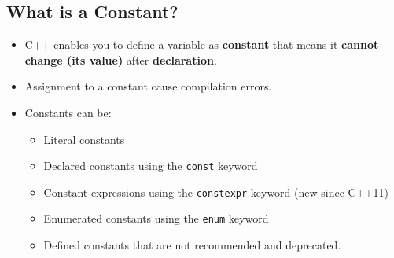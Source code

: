 \documentclass[10pt]{article}
\newcommand{\pbreak}{\vspace{30pt}}
\begin{document}
\subsection{What is a Constant?}
\begin{itemize}
	\item C++ enables you to define a variable as \textbf{constant} that means it \textbf{cannot change (its value)} after \textbf{declaration}.

	\item Assignment to a constant cause compilation errors.

	\item Constants can be:
		\begin{itemize}
			\item Literal constants
			\item Declared constants using the \verb|const| keyword
			\item Constant expressions using the \verb|constexpr| keyword (new since C++11)
			\item Enumerated constants using the \verb|enum| keyword
			\item Defined constants that are not recommended and deprecated.
		\end{itemize}
\end{itemize}

\pbreak
\end{document}
